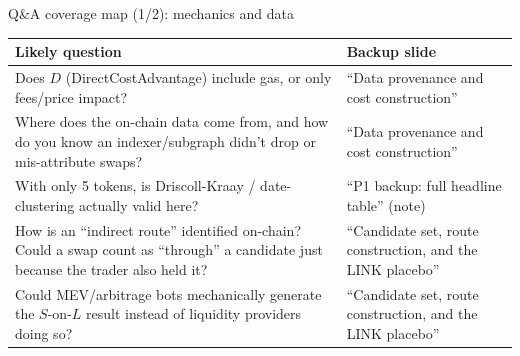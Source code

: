 \documentclass[aspectratio=169]{beamer}
\begin{document}
\begin{frame}{Q\&A coverage map (1/2): mechanics and data}
  \footnotesize
  \begin{center}
  \begin{tabular}{@{}>{\raggedright\arraybackslash}p{5.6cm}>{\raggedright\arraybackslash}p{5.9cm}@{}}
    \toprule
    Likely question & Backup slide \\
    \midrule
    Does $D$ (DirectCostAdvantage) include gas, or only fees/price impact? & ``Data provenance and cost construction'' \\[0.3em]
    Where does the on-chain data come from, and how do you know an indexer/subgraph didn't drop or mis-attribute swaps? & ``Data provenance and cost construction'' \\[0.3em]
    With only 5 tokens, is Driscoll-Kraay / date-clustering actually valid here? & ``P1 backup: full headline table'' (note) \\[0.3em]
    How is an ``indirect route'' identified on-chain? Could a swap count as ``through'' a candidate just because the trader also held it? & ``Candidate set, route construction, and the LINK placebo'' \\[0.3em]
    Could MEV/arbitrage bots mechanically generate the $S$-on-$L$ result instead of liquidity providers doing so? & ``Candidate set, route construction, and the LINK placebo'' \\
    \bottomrule
  \end{tabular}
  \end{center}
\end{frame}
\end{document}
